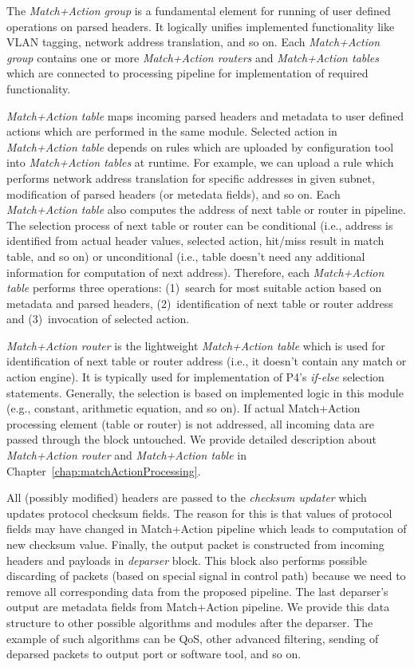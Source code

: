 The \emph{Match+Action group} is a fundamental element for running of user defined operations on parsed headers. It logically unifies
implemented functionality like VLAN tagging, network address translation, and so on. 
Each \emph{Match+Action group} contains one or more \emph{Match+Action routers} and \emph{Match+Action tables} which are 
connected to processing pipeline for implementation of required functionality.  

\emph{Match+Action table} maps incoming parsed headers and metadata to user defined actions which are performed in the same module.
Selected action in \emph{Match+Action table} depends on rules which are uploaded by configuration tool 
into \emph{Match+Action tables} at runtime. 
For example, we can upload a rule which performs network address translation for specific addresses in
given subnet, modification of parsed headers (or metedata fields), and so on. 
Each \emph{Match+Action table} also computes the address of next table or router in pipeline. 
The selection process of next table or router can be conditional (i.e., address is identified from actual header values, selected action, 
hit/miss result in match table, and so on) or unconditional (i.e., table doesn't need any additional information for computation of next address). 
Therefore, each \emph{Match+Action table} performs three operations: 
(1)~search for most suitable action based on metadata and parsed headers, (2)~identification of next table or router address and 
(3)~invocation of selected action. 

\emph{Match+Action router} is the lightweight \emph{Match+Action table} which is used for identification of next table or router address
(i.e., it doesn't contain any match or action engine). 
It is typically used for implementation of P4's \textit{if-else} selection statements. 
Generally, the selection is based on implemented logic in this module (e.g., constant, arithmetic equation, and so on).
If actual Match+Action processing element (table or router) is not addressed, all incoming data are passed through the block untouched.
We provide detailed description about \emph{Match+Action router} and \emph{Match+Action table} in Chapter~\ref{chap:matchActionProcessing}. 

All (possibly modified) headers are passed to the \emph{checksum updater} which updates protocol checksum fields.
The reason for this is that values of protocol fields may have changed in Match+Action pipeline which leads to computation of new checksum value. 
Finally, the output packet is constructed from incoming headers and payloads in \emph{deparser} block.
This block also performs possible discarding of packets (based on special signal in control path) 
because we need to remove all corresponding data from the proposed pipeline.
The last deparser's output are metadata fields from Match+Action pipeline. 
We provide this data structure to other possible algorithms and modules after the deparser. 
The example of such algorithms can be QoS, other advanced filtering, sending of deparsed packets to output port or software tool, and so on.

